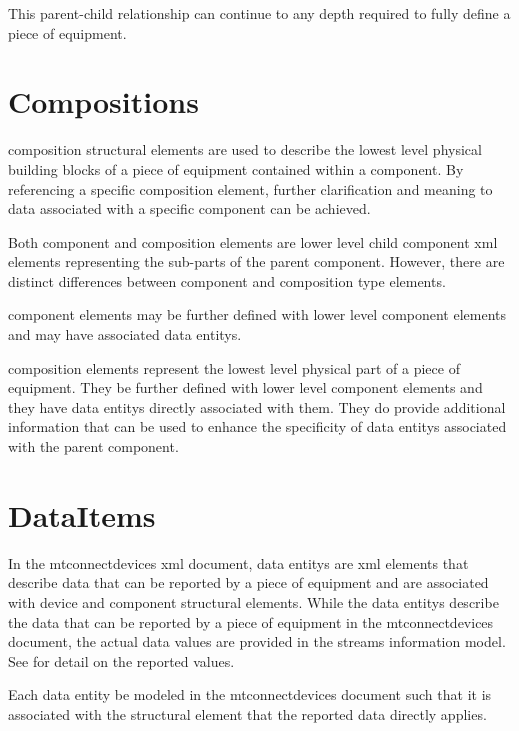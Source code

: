 This parent-child relationship can continue to any depth required to fully define a piece of equipment.



\section{Compositions}
\label{sec:Compositions}
\gls{composition} \glspl{structural element} are used to describe the lowest level physical building blocks of a piece of equipment contained within a \gls{component}. By referencing a specific \gls{composition} element, further clarification and meaning to data associated with a specific \gls{component} can be achieved.

Both \gls{component} and \gls{composition} elements are \gls{lower level} child \gls{component} \gls{xml} elements representing the sub-parts of the parent \gls{component}.  However, there are distinct differences between \gls{component} and \gls{composition} type elements.

\gls{component} elements may be further defined with \gls{lower level} \gls{component} elements and may have associated \glspl{data entity}.

\gls{composition} elements represent the lowest level physical part of a piece of equipment.  They \mustnot be further defined with \gls{lower level} \gls{component} elements and they \mustnot have \glspl{data entity} directly associated with them.   They do provide additional information that can be used to enhance the specificity of \glspl{data entity} associated with the parent \gls{component}.


\section{DataItems}
\label{sec:DataItems}
In the \gls{mtconnectdevices} \gls{xml} document, \glspl{data entity} are \gls{xml} elements that describe data that can be reported by a piece of equipment and are associated with \gls{device} and \gls{component} \glspl{structural element}.   While the \glspl{data entity} describe the data that can be reported by a piece of equipment in the \gls{mtconnectdevices} document, the actual data values are provided in the \gls{streams information model}.   See  for detail on the reported values.

Each \gls{data entity} \should be modeled in the \gls{mtconnectdevices} document such that it is associated with the \gls{structural element} that the reported data directly applies.

